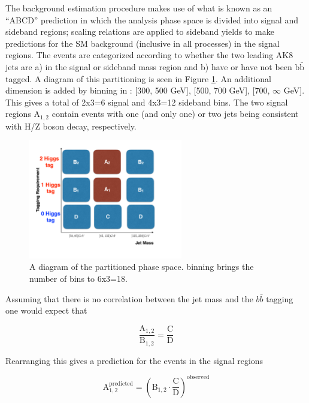 The background estimation procedure makes use of what is known as an ``ABCD'' prediction in which the analysis phase space is divided into signal and sideband regions; scaling relations are applied to sideband yields to make predictions for the SM background (inclusive in all processes) in the signal regions. The events are categorized according to whether the two leading AK8 jets are a) in the signal or sideband mass region and b) have or have not been $\mathrm{b}\bar{\mathrm{b}}$ tagged.  A diagram of this partitioning is seen in Figure \ref{fig:abcd}. An additional dimension is added by binning in \ptmiss: [300, 500 GeV], [500, 700 GeV], [700, $\infty$ GeV]. This gives a total of 2x3=6 signal and 4x3=12 sideband bins. The two signal regions $\mathrm{A}_{1, 2}$ contain events with one (and only one) or two jets being consistent with H/Z boson decay, respectively.

\begin{figure}[hb!]
\centering
\includegraphics[width=0.6\textwidth]{figs/CMS-SUS-17-006_Figure-aux_002.pdf}
\caption{A diagram of the partitioned phase space. \ptmiss binning brings the number of bins to 6x3=18.}
\label{fig:abcd}
\end{figure}

Assuming that there is no correlation between the jet mass and the $b\bar{b}$ tagging one would expect that

\begin{equation}
\frac{\mathrm{A}_{1, 2}}{\mathrm{B}_{1, 2}} = \frac{\mathrm{C}}{\mathrm{D}}
\end{equation}

Rearranging this gives a prediction for the events in the signal regions

\begin{equation}
\mathrm{A}_{1, 2}^{\mathrm{predicted}} = (\mathrm{B}_{1, 2} \cdot \frac{\mathrm{C}}{\mathrm{D}})^{\mathrm{observed}}
\end{equation}

